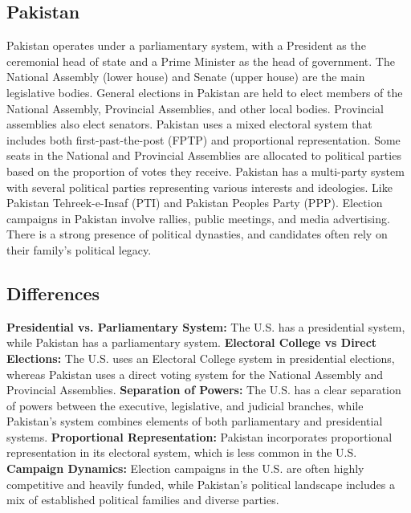 \documentclass{article}
\begin{document}
\subsection{Pakistan}
Pakistan operates under a parliamentary system, with a President as the ceremonial head of state and a Prime Minister as the head of government. The National Assembly (lower house) and Senate (upper house) are the main legislative bodies.
\newline
General elections in Pakistan are held to elect members of the National Assembly, Provincial Assemblies, and other local bodies. Provincial assemblies also elect senators.
\newline
Pakistan uses a mixed electoral system that includes both first-past-the-post (FPTP) and proportional representation. Some seats in the National and Provincial Assemblies are allocated to political parties based on the proportion of votes they receive.
\newline
Pakistan has a multi-party system with several political parties representing various interests and ideologies. Like Pakistan Tehreek-e-Insaf (PTI) and Pakistan Peoples Party (PPP).
\newline
Election campaigns in Pakistan involve rallies, public meetings, and media advertising. There is a strong presence of political dynasties, and candidates often rely on their family's political legacy.
\newline
\subsection{Differences}
\textbf{Presidential vs. Parliamentary System:} The U.S. has a presidential system, while Pakistan has a parliamentary system.
\newline
\textbf{Electoral College vs Direct Elections:} The U.S. uses an Electoral College system in presidential elections, whereas Pakistan uses a direct voting system for the National Assembly and Provincial Assemblies.
\newline
\textbf{Separation of Powers:} The U.S. has a clear separation of powers between the executive, legislative, and judicial branches, while Pakistan's system combines elements of both parliamentary and presidential systems.
\newline
\textbf{Proportional Representation:} Pakistan incorporates proportional representation in its electoral system, which is less common in the U.S.
\newline
\textbf{Campaign Dynamics:} Election campaigns in the U.S. are often highly competitive and heavily funded, while Pakistan's political landscape includes a mix of established political families and diverse parties.
\end{document}
